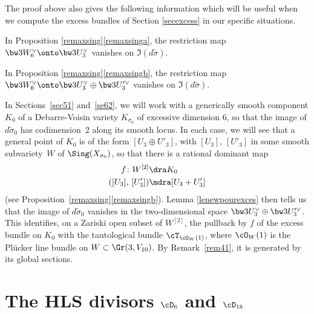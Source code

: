The proof above also gives the following information which will be useful when we compute the excess bundles of Section \ref{secexcess} in our specific situations.

\begin{lemm} \label{lenewpourexces}
In Proposition
\ref{remaxsing}\eqref{remaxsinga}, the restriction map
$\bw3 W_6^\vee\onto \bw3 U_3^\vee$ vanishes on $\Im (d\tilde{\sigma})$.

In
Proposition
\ref{remaxsing}\eqref{remaxsingb}, the restriction map
$\bw3 W_6^\vee\onto \bw3 U_3^\vee\oplus \bw3 U_3^{\prime\vee}$ vanishes on $\Im (d\tilde{\sigma})$.
\end{lemm}

\begin{rema}\label{re45}
In Sections~\ref{sec51} and~\ref{se62}, we will work with a generically smooth component $K_0$ of a Debarre-Voisin variety $K_{\sigma_0}$ of excessive dimension $6$, so that the image of $d\tilde{\sigma}_0$ has codimension~$2$ along its smooth locus. In each case, we will see that a general point of $K_0$ is of the form
$[U_3\oplus U'_3]$, with $[U_3],\,[U'_3]$ in some smooth subvariety~$W$ of $ \Sing (X_{\sigma_0})$, so that there is a rational dominant map
\begin{align*}
f\colon W^{[2]}&\dra K_0\\
([U_3],\,[U'_3])&\mdra [U_3+ U'_3]
\end{align*}
(see Proposition~\ref{remaxsing}\eqref{remaxsingb}). Lemma \ref{lenewpourexces} then
tells us that the image of $d\tilde{\sigma}_0$ vanishes in the two-dimensional space $\bw3 U_3^\vee\oplus \bw3 U_3^{\prime\vee}$. This identifies, on
a Zariski open subset of $W^{[2]}$, the pullback by $f$ of the excess bundle on $K_0$
with the tautological bundle $\cT_{\cO_W(1)}$, where $\cO_W(1)$ is the Plücker line bundle
on $W\subset \Gr(3,V_{10})$. By Remark~\ref{rem41}, it is generated by its global sections.
\end{rema}

\section{The HLS divisors \texorpdfstring{$\cD_{6}$}{D6} and \texorpdfstring{$\cD_{18}$}{D18}}
\label{sechasset}

